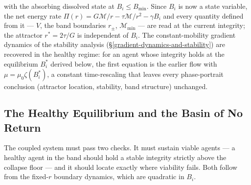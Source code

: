 \documentclass[11pt]{article}
\theoremstyle{plain}
\theoremstyle{definition}
\theoremstyle{remark}
\let\origsubsection\subsection
\renewcommand{\subsection}{\needspace{7\baselineskip}\origsubsection}
\begin{document}
with the absorbing dissolved state at \(B_i \leq B_{\min}\). Since
\(B_i\) is now a state variable, the net energy rate
\(\Pi(r) = G\mathcal{M}/r - \tau\mathcal{M}/r^2 - \gamma B_i\) and every
quantity defined from it --- \(V\), the band boundaries \(r_\pm\),
\(\mathcal{M}_{\min}\) --- are read at the current integrity; the
attractor \(r^* = 2\tau/G\) is independent of \(B_i\). The
constant-mobility gradient dynamics of the stability analysis
(§\ref{gradient-dynamics-and-stability}) are recovered in the healthy
regime: for an agent whose integrity holds at the equilibrium \(B_i^*\)
derived below, the first equation is the earlier flow with
\(\mu = \mu_0 \zeta(B_i^*)\), a constant time-rescaling that leaves
every phase-portrait conclusion (attractor location, stability, band
structure) unchanged.

\subsection{The Healthy Equilibrium and the Basin of No
Return}\label{the-healthy-equilibrium-and-the-basin-of-no-return}

The coupled system must pass two checks. It must sustain viable agents
--- a healthy agent in the band should hold a stable integrity strictly
above the collapse floor --- and it should locate exactly where
viability fails. Both follow from the fixed-\(r\) boundary dynamics,
which are quadratic in \(B_i\).
\end{document}
